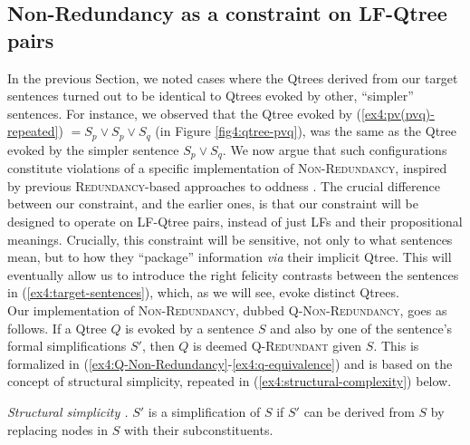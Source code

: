    

\subsection{Non-Redundancy as a constraint on LF-Qtree pairs}

In the previous Section, we noted cases where the Qtrees derived from our target sentences turned out to be identical to Qtrees evoked by other, ``simpler'' sentences.
For instance, we observed that the Qtree evoked by (\ref{ex4:pv(pvq)-repeated}) $= S_p \vee S_p \vee S_q$ (in Figure \ref{fig4:qtree-pvq}), was the same as the Qtree evoked by the simpler sentence $S_p \vee S_q$. We now argue that such configurations constitute violations of a specific implementation of \textsc{Non-Redundancy}, inspired by previous \textsc{Redundancy}-based approaches to oddness \citep{Meyer2013,Katzir2014,Mayr2016}. The crucial difference between our constraint, and the earlier ones, is that our constraint will be designed to operate on LF-Qtree pairs, instead of just LFs and their propositional meanings. Crucially, this constraint will be sensitive, not only to what sentences mean, but to how they ``package'' information \textit{via} their implicit Qtree. This will eventually allow us to introduce the right felicity contrasts between the sentences in (\ref{ex4:target-sentences}), which, as we will see, evoke distinct Qtrees.\\

Our implementation of \textsc{Non-Redundancy}, dubbed \textsc{Q-Non-Redundancy}, goes as follows. If a Qtree $Q$ is evoked by a sentence $S$ and also by one of the sentence's formal simplifications $S'$, then $Q$ is deemed \textsc{Q-Redundant} given $S$. This is formalized in (\ref{ex4:Q-Non-Redundancy}-\ref{ex4:q-equivalence}) and is based on the concept of structural simplicity, repeated in (\ref{ex4:structural-complexity}) below.


\begin{exe}
	\ex 
	\begin{xlist}
		\label{ex4:Q-Non-Redundancy}
		\label{ex4:q-equivalence}
	\end{xlist}
	 {\textit{Structural simplicity \citep{Katzir2007}.} $S'$ is a simplification of $S$ if $S'$ can be derived from $S$ by replacing nodes in $S$ with their subconstituents.}
\end{exe}





